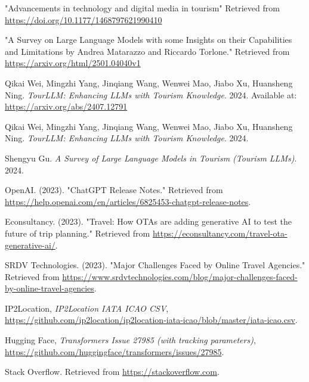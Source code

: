 \documentclass[manuscript,review,anonymous]{acmart}
\begin{document}
\begin{thebibliography}{99}
    
     "Advancements in technology and digital media in tourism" Retrieved from \url{https://doi.org/10.1177/1468797621990410}
    
     "A Survey on Large Language Models with some Insights on their Capabilities and Limitations by Andrea Matarazzo and Riccardo Torlone." Retrieved from \url{https://arxiv.org/html/2501.04040v1}
    
     Qikai Wei, Mingzhi Yang, Jinqiang Wang, Wenwei Mao, Jiabo Xu, Huansheng Ning. \textit{TourLLM: Enhancing LLMs with Tourism Knowledge}. 2024. Available at: \url{https://arxiv.org/abs/2407.12791}
    
     Qikai Wei, Mingzhi Yang, Jinqiang Wang, Wenwei Mao, Jiabo Xu, Huansheng Ning. \textit{TourLLM: Enhancing LLMs with Tourism Knowledge}. 2024.
    
     Shengyu Gu. \textit{A Survey of Large Language Models in Tourism (Tourism LLMs)}. 2024.
    
        OpenAI. (2023). "ChatGPT Release Notes." Retrieved from \url{https://help.openai.com/en/articles/6825453-chatgpt-release-notes}.

        Econsultancy. (2023). "Travel: How OTAs are adding generative AI to test the future of trip planning." Retrieved from \url{https://econsultancy.com/travel-ota-generative-ai/}.

        SRDV Technologies. (2023). "Major Challenges Faced by Online Travel Agencies." Retrieved from \url{https://www.srdvtechnologies.com/blog/major-challenges-faced-by-online-travel-agencies}.

        IP2Location, \emph{IP2Location IATA ICAO CSV}, \href{https://github.com/ip2location/ip2location-iata-icao/blob/master/iata-icao.csv}{https://github.com/ip2location/ip2location-iata-icao/blob/master/iata-icao.csv}.

        Hugging Face, \emph{Transformers Issue 27985 (with tracking parameters)}, \href{https://github.com/huggingface/transformers/issues/27985}{https://github.com/huggingface/transformers/issues/27985}.

        Stack Overflow. Retrieved from \url{https://stackoverflow.com}.


\end{thebibliography}
\end{document}
